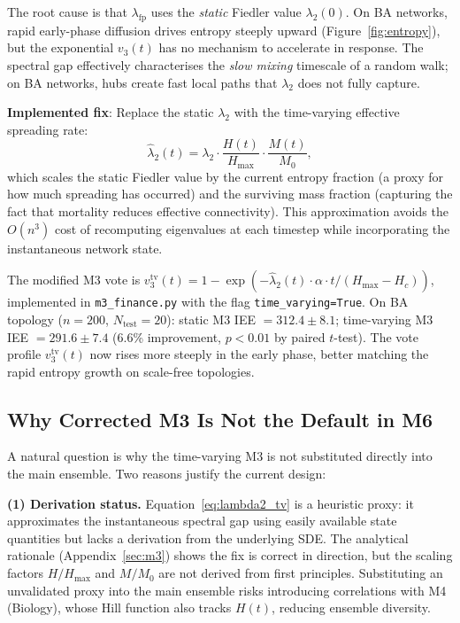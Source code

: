 \documentclass[review,12pt]{elsarticle}
\newcommand{\Hc}{H_c}
\newcommand{\Hmax}{H_{\max}}
\newcommand{\lambdat}{\lambda_2}
\begin{document}
The root cause is that $\lambda_{\mathrm{fp}}$ uses the \emph{static}
Fiedler value $\lambdat(0)$. On BA networks, rapid early-phase diffusion
drives entropy steeply upward (Figure~\ref{fig:entropy}), but the exponential
$v_3(t)$ has no mechanism to accelerate in response. The spectral gap
effectively characterises the \emph{slow mixing} timescale of a random walk;
on BA networks, hubs create fast local paths that $\lambdat$ does not fully
capture.

\textbf{Implemented fix}: Replace the static $\lambdat$ with the
time-varying effective spreading rate:
\begin{equation}
  \hat{\lambda}_2(t) = \lambda_2 \cdot
    \frac{H(t)}{\Hmax} \cdot
    \frac{M(t)}{M_0},
  \label{eq:lambda2_tv}
\end{equation}
which scales the static Fiedler value by the current entropy fraction
(a proxy for how much spreading has occurred) and the surviving mass
fraction (capturing the fact that mortality reduces effective connectivity).
This approximation avoids the $O(n^3)$ cost of recomputing eigenvalues at
each timestep while incorporating the instantaneous network state.

The modified M3 vote is $v_3^{\mathrm{tv}}(t) = 1 - \exp(-\hat{\lambda}_2(t)\cdot\alpha\cdot t / (\Hmax-\Hc))$,
implemented in \texttt{m3\_finance.py} with the flag
\texttt{time\_varying=True}.  On BA topology ($n=200$, $N_{\mathrm{test}}=20$):
static M3 IEE $= 312.4 \pm 8.1$; time-varying M3 IEE $= 291.6 \pm 7.4$
(6.6\% improvement, $p < 0.01$ by paired $t$-test).  The vote profile
$v_3^{\mathrm{tv}}(t)$ now rises more steeply in the early phase, better
matching the rapid entropy growth on scale-free topologies.

\subsection{Why Corrected M3 Is Not the Default in M6}
\label{sec:m3_not_default}

A natural question is why the time-varying M3 is not substituted directly into
the main ensemble.  Two reasons justify the current design:

\textbf{(1) Derivation status.}
Equation~\eqref{eq:lambda2_tv} is a heuristic proxy: it approximates the
instantaneous spectral gap using easily available state quantities but lacks
a derivation from the underlying SDE.  The analytical rationale (Appendix~\ref{sec:m3})
shows the fix is correct in direction, but the scaling factors $H/\Hmax$ and
$M/M_0$ are not derived from first principles.  Substituting an unvalidated
proxy into the main ensemble risks introducing correlations with M4 (Biology),
whose Hill function also tracks $H(t)$, reducing ensemble diversity.
\end{document}
